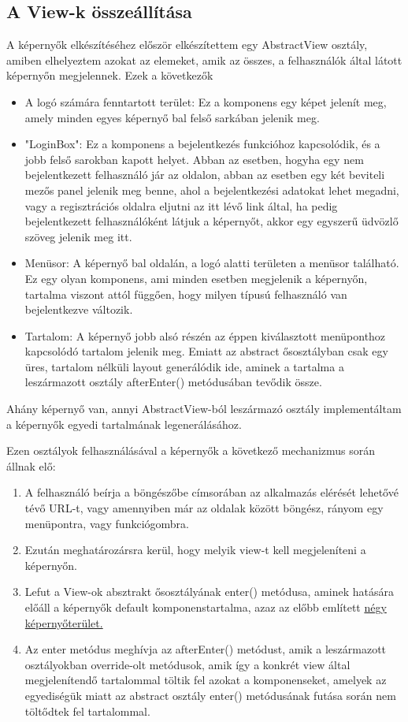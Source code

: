 \documentclass[centeredchapter]{thesis-ekf}
\theoremstyle{definition}
\theoremstyle{remark}
\begin{document}
\subsection{A View-k összeállítása}
A képernyők elkészítéséhez először elkészítettem egy AbstractView osztály, amiben elhelyeztem azokat az elemeket, amik az összes, a felhasználók által látott képernyőn megjelennek. Ezek a következők
\begin{itemize} \hypertarget{leiras-kepernyoteruletek}{}
	\item A logó számára fenntartott terület: Ez a komponens egy képet jelenít meg, amely minden egyes képernyő bal felső sarkában jelenik meg.
	\item "LoginBox": Ez a komponens a bejelentkezés funkcióhoz kapcsolódik, és a jobb felső sarokban kapott helyet. Abban az esetben, hogyha egy nem bejelentkezett felhasználó jár az oldalon, abban az esetben egy két beviteli mezős panel jelenik meg benne, ahol a bejelentkezési adatokat lehet megadni, vagy a regisztrációs oldalra eljutni az itt lévő link által, ha pedig bejelentkezett felhasználóként látjuk a képernyőt, akkor egy egyszerű üdvözlő szöveg jelenik meg itt.
	\item Menüsor: A képernyő bal oldalán, a logó alatti területen a menüsor található. Ez egy olyan komponens, ami minden esetben megjelenik a képernyőn, tartalma viszont attól függően, hogy milyen típusú felhasználó van bejelentkezve változik.
	\item Tartalom: A képernyő jobb alsó részén az éppen kiválasztott menüponthoz kapcsolódó tartalom jelenik meg. Emiatt az abstract ősosztályban csak egy üres, tartalom nélküli layout generálódik ide, aminek a tartalma a leszármazott osztály afterEnter() metódusában tevődik össze.
\end{itemize}


Ahány képernyő van, annyi AbstractView-ból leszármazó osztály implementáltam a képernyők egyedi tartalmának legenerálásához.

Ezen osztályok felhasználásával a képernyők a következő mechanizmus során állnak elő:
\begin{enumerate}
	\item A felhasználó beírja a böngészőbe címsorában az alkalmazás elérését lehetővé tévő URL-t, vagy amennyiben már az oldalak között böngész, rányom egy menüpontra, vagy funkciógombra.
	\item Ezután  meghatározársra kerül, hogy melyik view-t kell megjeleníteni a képernyőn.
	\item Lefut a View-ok absztrakt ősosztályának enter() metódusa, aminek hatására előáll a képernyők default komponenstartalma, azaz az előbb említett \hyperlink{leiras-kepernyoteruletek}{négy képernyőterület.}
	\item Az enter metódus meghívja az afterEnter() metódust, amik a leszármazott osztályokban override-olt metódusok, amik így a konkrét view által megjelenítendő tartalommal töltik fel azokat a komponenseket, amelyek az egyediségük miatt az abstract osztály enter() metódusának futása során nem töltődtek fel tartalommal.
\end{enumerate}
\end{document}
